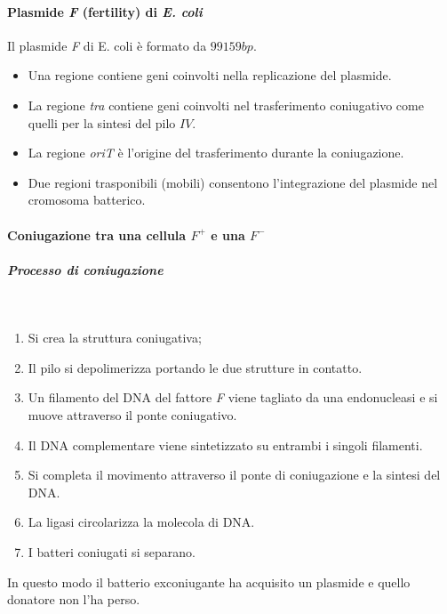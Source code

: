 			\paragraph{Plasmide \emph{F} (fertility) di \textit{E. coli}}
			Il plasmide \emph{F} di E. coli \`e formato da $99159 bp$.
			\begin{multicols}{2}
				\begin{itemize}
    					\item Una regione contiene geni coinvolti nella replicazione del plasmide.
    					\item La regione \emph{tra} contiene geni coinvolti nel trasferimento coniugativo come quelli per la sintesi del pilo $IV$.
					\item La regione \emph{oriT} è l'origine del trasferimento durante la coniugazione. 
    					\item Due regioni trasponibili (mobili) consentono l'integrazione del plasmide nel cromosoma batterico. 
				\end{itemize}
			\end{multicols}

			\paragraph{Coniugazione tra una cellula \emph{$F^{+}$} e una \emph{$F^{-}$}}
			
				\subparagraph{Processo di coniugazione}\mbox{}\\
				\begin{multicols}{2}
					\begin{enumerate}
    						\item Si crea la struttura coniugativa; 
    						\item Il pilo si depolimerizza portando le due strutture in contatto.
						\item Un filamento del DNA del fattore \emph{F} viene tagliato da una endonucleasi e si muove attraverso il ponte coniugativo.
    						\item Il DNA complementare viene sintetizzato su entrambi i singoli filamenti.
    						\item Si completa il movimento attraverso il ponte di coniugazione e la sintesi del DNA.
    						\item La ligasi circolarizza la molecola di DNA. 
						\item I batteri coniugati si separano. 
					\end{enumerate}
				\end{multicols}
				In questo modo il batterio exconiugante ha acquisito un plasmide e quello donatore non l'ha perso.

